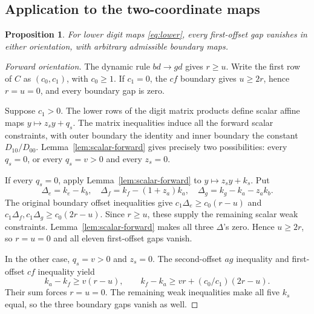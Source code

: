 \documentclass[11pt,a4paper]{article}
\newtheorem{proposition}[theorem]{Proposition}
\begin{document}
\subsection{Application to the two-coordinate maps}
\begin{proposition}\label{prop:lower}
For lower digit maps \eqref{eq:lower}, every first-offset gap vanishes in
either orientation, with arbitrary admissible boundary maps.
\end{proposition}

\begin{proof}[Forward orientation]
The dynamic rule $bd\to gd$ gives $r\ge u$. Write the first row of $C$
as $(c_0,c_1)$, with $c_0\ge1$. If $c_1=0$, the $cf$ boundary gives
$u\ge2r$, hence $r=u=0$, and every boundary gap is zero.

Suppose $c_1>0$. The lower rows of the digit matrix products define
scalar affine maps $y\mapsto z_sy+q_s$. The matrix inequalities induce
all the forward scalar constraints, with outer boundary the identity and
inner boundary the constant $D_{10}/D_{00}$. Lemma~\ref{lem:scalar-forward} gives precisely two possibilities: every $q_s=0$, or
every $q_s=v>0$ and every $z_s=0$.

If every $q_s=0$, apply Lemma~\ref{lem:scalar-forward} to
$y\mapsto z_sy+k_s$. Put
\[
\Delta_e=k_e-k_b,\quad
\Delta_f=k_f-(1+z_a)k_a,\quad
\Delta_g=k_g-k_a-z_ak_b.
\]
The original boundary offset inequalities give
$c_1\Delta_e\ge c_0(r-u)$ and
$c_1\Delta_f,c_1\Delta_g\ge c_0(2r-u)$.
Since $r\ge u$, these supply the remaining scalar weak constraints.
Lemma~\ref{lem:scalar-forward} makes all three $\Delta$'s zero. Hence $u\ge2r$,
so $r=u=0$ and all eleven first-offset gaps vanish.

In the other case, $q_s=v>0$ and $z_s=0$. The second-offset $ag$
inequality and first-offset $cf$ inequality yield
\[
k_a-k_f\ge v(r-u),\qquad
k_f-k_a\ge vr+(c_0/c_1)(2r-u).
\]
Their sum forces $r=u=0$. The remaining weak inequalities make all five
$k_s$ equal, so the three boundary gaps vanish as well.
\end{proof}
\end{document}
